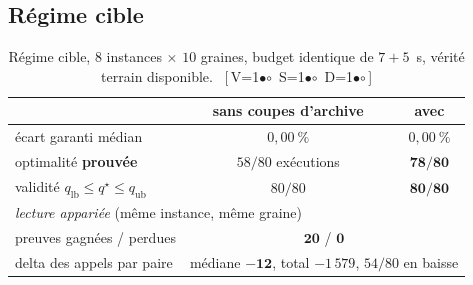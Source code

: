 \documentclass[11pt,a4paper]{article}
\theoremstyle{plain}
\theoremstyle{remark}
\newcommand{\qs}{q^{\star}}
\newcommand{\cfgm}[1]{\ifnum#1=1$\bullet$\else$\circ$\fi}
\newcommand{\conf}[3]{%
  \textsf{\footnotesize[\,V\cfgm{#1}\ S\cfgm{#2}\ D\cfgm{#3}\,]}}
\begin{document}
\subsection{Régime cible}

\begin{table}[H]
\centering
\caption{Régime cible, $8$ instances $\times$ $10$ graines, budget identique
de $7+5$~s, vérité terrain disponible.\ \conf{0}{0}{0}}
\label{tab:res1}
\begin{tabular}{lcc}
\toprule
& sans coupes d'archive & avec\\
\midrule
écart garanti médian & $0{,}00\ \%$ & $0{,}00\ \%$\\
optimalité \textbf{prouvée} & $58/80$ exécutions & $\mathbf{78/80}$\\
validité $q_{\text{lb}}\le\qs\le q_{\text{ub}}$ & $80/80$ & $\mathbf{80/80}$\\
\midrule
\multicolumn{3}{l}{\emph{lecture appariée} (même instance, même graine)}\\
preuves gagnées / perdues & \multicolumn{2}{c}{$\mathbf{20}$ / $\mathbf{0}$}\\
delta des appels par paire & \multicolumn{2}{c}{médiane $\mathbf{-12}$,
  total $-1\,579$, $54/80$ en baisse}\\
\bottomrule
\end{tabular}
\end{table}
\end{document}
